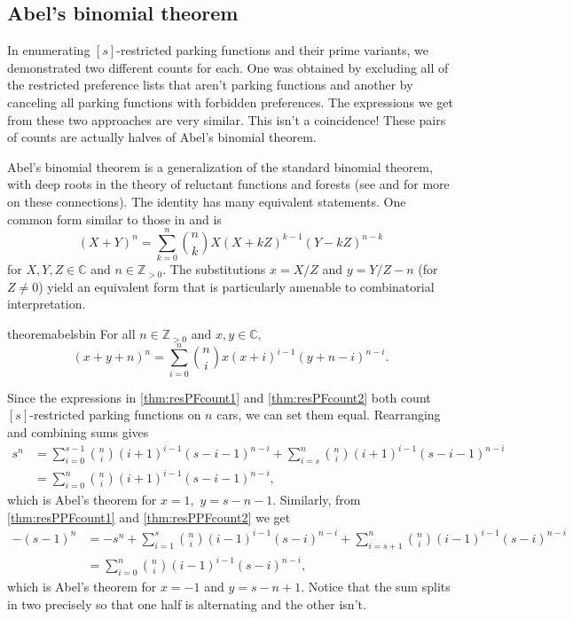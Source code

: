 \documentclass[12pt]{article}
\begin{document}
\subsection{Abel's binomial theorem} \label{sec:abelsbin}

In enumerating $[s]$-restricted parking functions and their prime variants, we demonstrated two different counts for each. One was obtained by excluding all of the restricted preference lists that aren't parking functions and another by canceling all parking functions with forbidden preferences. The expressions we get from these two approaches are very similar. This isn't a coincidence! These pairs of counts are actually halves of Abel's binomial theorem.

Abel's binomial theorem is a generalization of the standard binomial theorem, with deep roots in the theory of reluctant functions and forests (see \cite{shapiro-1991} and \cite{pitman-2002} for more on these connections). The identity has many equivalent statements. One common form similar to those in \cite{shapiro-1991} and \cite{zucker-2024} is
\[
	(X + Y)^{n} = \sum_{k = 0}^{n} \binom{n}{k} X (X + kZ)^{k - 1} (Y - k Z)^{n - k}
\]
for $X, Y, Z \in \mathbb{C}$ and $n \in \mathbb{Z}_{> 0}$. The substitutions $x = X/Z$ and $y = Y/Z - n$ (for $Z \neq 0$) yield an equivalent form that is particularly amenable to combinatorial interpretation.

\begin{restatable}{theorem}{abelsbin}
	For all $n\in\mathbb{Z}_{>0}$ and $x,y\in\mathbb{C},$
    \[
		(x + y + n)^{n} = \sum_{i = 0}^{n} \binom{n}{i} x (x + i)^{i - 1} (y + n - i)^{n - i}.
	\]
\end{restatable}

Since the expressions in \cref{thm:resPFcount1} and \cref{thm:resPFcount2} both count $[s]$-restricted parking functions on $n$ cars, we can set them equal. Rearranging and combining sums gives
\begin{align*}
    s^{n} &= \sum_{i = 0}^{s - 1} \binom{n}{i} (i + 1)^{i - 1} (s - i - 1)^{n - i} + \sum_{i = s}^{n} \binom{n}{i} (i + 1)^{i - 1} (s - i - 1)^{n - i}\\
    &=\sum_{i = 0}^{n} \binom{n}{i} (i + 1)^{i - 1} (s - i - 1)^{n - i},
\end{align*}
which is Abel's theorem for $x=1,$ $y=s-n-1.$ Similarly, from \cref{thm:resPPFcount1} and \cref{thm:resPPFcount2} we get 
\begin{align*}
    - (s - 1)^{n} &= -s^n + \sum_{i = 1}^{s} \binom{n}{i} (i - 1)^{i - 1} (s - i)^{n - i} + \sum_{i = s + 1}^{n} \binom{n}{i} (i - 1)^{i - 1} (s - i)^{n - i}\\
    &=\sum_{i=0}^n \binom{n}{i} (i - 1)^{i - 1} (s - i)^{n - i},
\end{align*}
which is Abel's theorem for $x=-1$ and $y=s-n+1$. Notice that the sum splits in two precisely so that one half is alternating and the other isn't.
\end{document}
